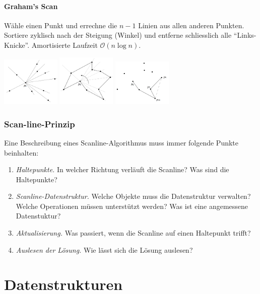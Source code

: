 \documentclass[a4paper, 9pt, DIV=20]{scrartcl}
\newcommand{\Oh}{\mathcal{O}}
\begin{document}
\paragraph{Graham's Scan}
Wähle einen Punkt und errechne die $n-1$ Linien aus allen anderen Punkten. Sortiere zyklisch nach der Steigung (Winkel) und entferne schliesslich alle ``Links-Knicke''. Amortisierte Laufzeit $\Oh(n\log{n})$.
\begin{center}
\includegraphics[width=2.8cm]{GrahamScan1}
\includegraphics[width=2.8cm]{GrahamScan2}
\includegraphics[width=2.8cm]{GrahamScan3}
\end{center}
\subsubsection{Scan-line-Prinzip}
Eine Beschreibung eines Scanline-Algorithmus muss immer folgende Punkte beinhalten:
\begin{enumerate}
\item \emph{Haltepunkte.} In welcher Richtung verläuft die Scanline? Was sind die Haltepunkte?
\item \emph{Scanline-Datenstruktur.} Welche Objekte muss die Datenstruktur verwalten? Welche Operationen müssen unterstützt werden? Was ist eine angemessene Datenstuktur?
\item \emph{Aktualisierung.} Was passiert, wenn die Scanline auf einen Haltepunkt trifft? 
\item \emph{Auslesen der Lösung.} Wie lässt sich die Lösung auslesen?
\end{enumerate}


\section{Datenstrukturen}
\end{document}
